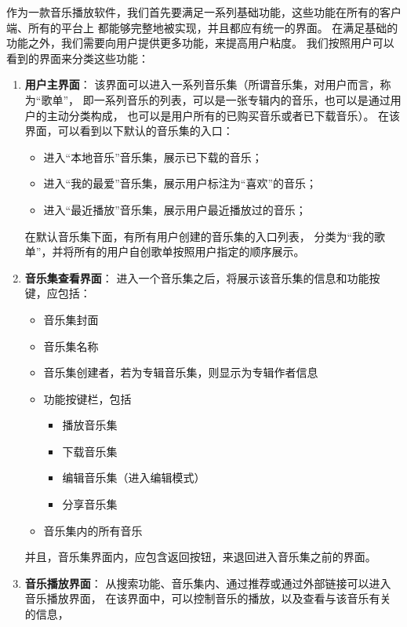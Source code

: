 作为一款音乐播放软件，我们首先要满足一系列基础功能，这些功能在所有的客户端、所有的平台上
    都能够完整地被实现，并且都应有统一的界面。
在满足基础的功能之外，我们需要向用户提供更多功能，来提高用户粘度。
我们按照用户可以看到的界面来分类这些功能：
\begin{enumerate}
    \item \textbf{用户主界面}：
    该界面可以进入一系列音乐集（所谓音乐集，对用户而言，称为``歌单''，
        即一系列音乐的列表，可以是一张专辑内的音乐，也可以是通过用户的主动分类构成，
        也可以是用户所有的已购买音乐或者已下载音乐）。
        在该界面，可以看到以下默认的音乐集的入口：
        \begin{itemize}
            \item 进入``本地音乐''音乐集，展示已下载的音乐；
            \item 进入``我的最爱''音乐集，展示用户标注为``喜欢''的音乐；
            \item 进入``最近播放''音乐集，展示用户最近播放过的音乐；
        \end{itemize}
        在默认音乐集下面，有所有用户创建的音乐集的入口列表，
        分类为``我的歌单''，并将所有的用户自创歌单按照用户指定的顺序展示。
    \item \textbf{音乐集查看界面}：
    进入一个音乐集之后，将展示该音乐集的信息和功能按键，应包括：
        \begin{itemize}
            \item 音乐集封面
            \item 音乐集名称
            \item 音乐集创建者，若为专辑音乐集，则显示为专辑作者信息
            \item 功能按键栏，包括
            \begin{itemize}
                \item 播放音乐集 
                \item 下载音乐集 
                \item 编辑音乐集（进入编辑模式） 
                \item 分享音乐集 
            \end{itemize}
            \item 音乐集内的所有音乐
        \end{itemize}
    并且，音乐集界面内，应包含返回按钮，来退回进入音乐集之前的界面。
    \item \textbf{音乐播放界面}：
    从搜索功能、音乐集内、通过推荐或通过外部链接可以进入音乐播放界面，
        在该界面中，可以控制音乐的播放，以及查看与该音乐有关的信息，

\end{enumerate}
